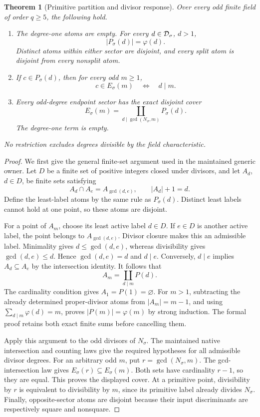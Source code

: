 \documentclass[11pt]{article}
\newtheorem{theorem}{Theorem}[section]
\begin{document}
\begin{theorem}[Primitive partition and divisor response]
\label{thm:odd-pell-primitive-atoms}
Over every odd finite field of order \(q\ge5\), the following hold.
\begin{enumerate}
\item The degree-one atoms are empty. For every
 \(d\in{\cal D}_\sigma\), \(d>1\),
 \[
                         |P_\sigma(d)|=\varphi(d).
 \]
 Distinct atoms within either sector are disjoint, and every
 split atom is disjoint from every nonsplit atom.
\item If \(c\in P_\sigma(d)\), then for every odd \(m\ge1\),
 \[
                    c\in E_\sigma(m)\quad\Longleftrightarrow\quad d\mid m.
 \]
\item Every odd-degree endpoint sector has the exact disjoint cover
 \[
 E_\sigma(m)=
 \coprod_{d\mid\gcd(N_\sigma,m)}P_\sigma(d).
 \]
 The degree-one term is empty.
\end{enumerate}
No restriction excludes degrees divisible by the field characteristic.
\end{theorem}

\begin{proof}
We first give the general finite-set argument used in the maintained
generic owner. Let \(D\) be a finite set of positive integers closed
under divisors, and let \(A_d\), \(d\in D\), be finite sets satisfying
\[
 A_d\cap A_e=A_{\gcd(d,e)},\qquad |A_d|+1=d.
\]
Define the least-label atoms by the same rule as \(P_\sigma(d)\).
Distinct least labels cannot hold at one point, so these atoms
are disjoint.

For a point of \(A_m\), choose its least active label \(d\in D\).
If \(e\in D\) is another active label, the point belongs to
\(A_{\gcd(d,e)}\). Divisor closure makes this an admissible label.
Minimality gives \(d\le\gcd(d,e)\), whereas divisibility gives
\(\gcd(d,e)\le d\). Hence \(\gcd(d,e)=d\) and \(d\mid e\).
Conversely, \(d\mid e\) implies \(A_d\subseteq A_e\) by the
intersection identity. It follows that
\[
                  A_m=\coprod_{d\mid m}P(d).
\]
The cardinality condition gives \(A_1=P(1)=\varnothing\).
For \(m>1\), subtracting the already determined proper-divisor
atoms from \(|A_m|=m-1\), and using
\(\sum_{d\mid m}\varphi(d)=m\), proves
\(|P(m)|=\varphi(m)\) by strong induction. The formal proof
retains both exact finite sums before cancelling them.

Apply this argument to the odd divisors of \(N_\sigma\).
The maintained native intersection and counting laws give the
required hypotheses for all admissible divisor degrees.
For an arbitrary odd \(m\), put \(r=\gcd(N_\sigma,m)\).
The gcd-intersection law gives
\(E_\sigma(r)\subseteq E_\sigma(m)\).
Both sets have cardinality \(r-1\), so they are equal.
This proves the displayed cover. At a primitive point,
divisibility by \(r\) is equivalent to divisibility by \(m\),
since its primitive label already divides \(N_\sigma\).
Finally, opposite-sector atoms are disjoint because their
input discriminants are respectively square and nonsquare.
\end{proof}
\end{document}
